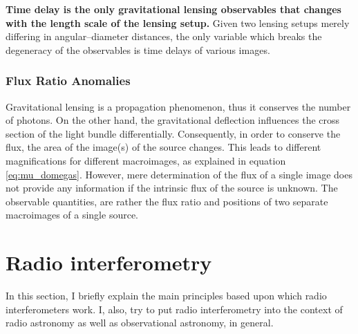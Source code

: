 \documentclass[paper=a4, fontsize=11pt]{scrartcl} %
\numberwithin{equation}{section} %
\numberwithin{figure}{section} %
\numberwithin{table}{section} %
\begin{document}
 {\bf Time delay is the only gravitational lensing observables that changes with the length scale of the lensing setup.} Given two lensing setups merely differing in angular--diameter distances, the only variable which breaks the degeneracy of the observables is time delays of various images.
 
 \subsubsection{Flux Ratio Anomalies}
 \label{subsec:Flux Ratio Anomalies}
Gravitational lensing is a propagation phenomenon, thus it conserves the number of photons. On the other hand, the gravitational deflection influences the cross section of the light bundle differentially. Consequently, in order to conserve the flux, the area of the image(s) of the source changes. This leads to different magnifications for different macroimages, as explained in equation \ref{eq:mu_domegas}. However, mere determination of the flux of a single image does not provide any information if the intrinsic flux of the source is unknown. The observable quantities, are rather the flux ratio and positions of two separate macroimages of a single source.


\newpage
\section{Radio interferometry}
In this section, I briefly explain the main principles based upon which radio interferometers work. I, also, try to put radio interferometry into the context of radio astronomy as well as observational astronomy, in general.

\end{document}
